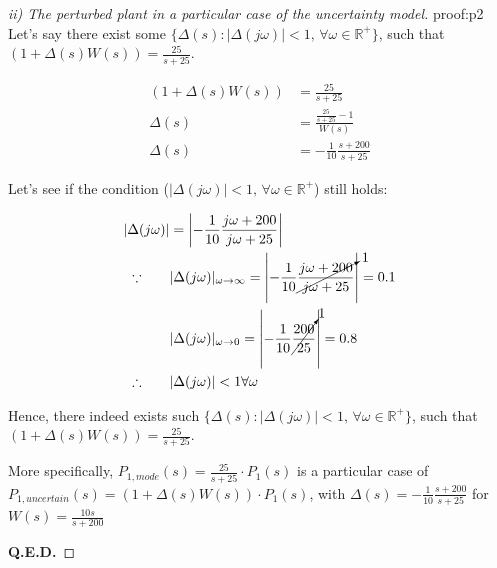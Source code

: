 \documentclass{tron}
\begin{document}
	\begin{proof}[ii) The perturbed plant in  a particular case of the uncertainty model]{proof:p2}
		Let's say there exist some $\{\Delta(s) : |\Delta(j\omega)| < 1 ,\,\forall \omega \in \mathbb{R^+}\}$, such that $(1 + \Delta(s)W(s)) = \frac{25}{s + 25}$.
		
		\begin{align}
			(1 + \Delta(s)W(s)) &= \frac{25}{s + 25} \\
			\Delta(s) &= \frac{\frac{25}{s + 25} - 1}{W(s)} \\
			\Delta(s) &= - \frac{1}{10} \frac{s+200}{s+25}
		\end{align}
		
		Let's see if the condition ($|\Delta(j\omega)| < 1 ,\,\forall \omega \in \mathbb{R^+}$) still holds:
		
		\begin{align}
			|\Delta(j\omega)| &= \left|- \frac{1}{10} \frac{j\omega+200}{j\omega+25}\right| \\
			\because \qquad & |\Delta(j\omega)|_{\omega\rightarrow\infty} = \left|- \frac{1}{10} \cancelto{1}{\frac{j\omega+200}{j\omega+25}} \right| = 0.1\\
							& |\Delta(j\omega)|_{\omega\rightarrow0} = \left|- \frac{1}{10} \cancelto{1}{\frac{200}{25}} \right| = 0.8\\
			\therefore \qquad & |\Delta(j\omega)| < 1 \forall \omega
		\end{align}
		
		Hence, there indeed exists such $\{\Delta(s) : |\Delta(j\omega)| < 1 ,\,\forall \omega \in \mathbb{R^+}\}$, such that $(1 + \Delta(s)W(s)) = \frac{25}{s + 25}$. 
		
		More specifically, $P_{1,mode}(s) = \frac{25}{s+25} \cdot P_1(s)$ is a particular case of $P_{1,uncertain}(s) = (1 + \Delta(s) W(s))\cdot P_1(s)$, with $\Delta(s) = - \frac{1}{10} \frac{s+200}{s+25}$ for $W(s) = \frac{10s}{s + 200}$		
		
		\textbf{Q.E.D.}
	\end{proof}
\end{document}
